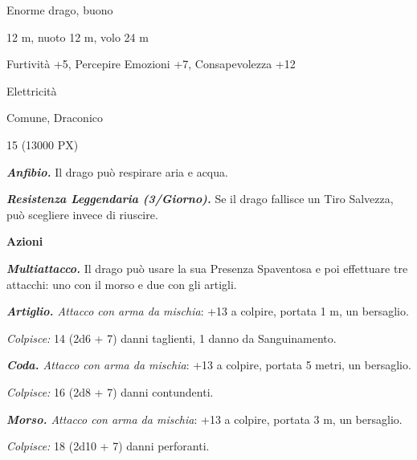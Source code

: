 \begin{multicols}{2}
{
\begin{description}[noitemsep, topsep=0pt, parsep=0pt, partopsep=0pt, itemsep=1pt, leftmargin=2.35cm,  labelwidth=2.2cm, itemindent=0cm, listparindent=0pt] %
\setlength{\baselineskip}{10pt}
\item[\textbf{Taglia/Tipo}] Enorme drago, buono
\item[\textbf{Caratt.}] 
\item[\textbf{Punti Ferita}] 
\item[\textbf{Movimento}] 12 m, nuoto 12 m, volo 24 m
\item[\textbf{Tiri Salvez.}] 
\item[\textbf{Comp.}] Furtività +5, Percepire Emozioni +7, Consapevolezza +12
\item[\textbf{Imm. Danni}] Elettricità
\item[\textbf{Sensi}] 
\item[\textbf{Linguaggi}] Comune, Draconico
\item[\textbf{Sfida}] 15 (13000 PX)
\end{description}
\smallskip

\emph{\textbf{Anfibio.}} Il drago può respirare aria e acqua.

\emph{\textbf{Resistenza Leggendaria (3/Giorno).}} Se il drago fallisce un Tiro Salvezza, può scegliere invece di riuscire.

\textbf{Azioni}

\emph{\textbf{Multiattacco.}} Il drago può usare la sua Presenza Spaventosa e poi effettuare tre attacchi: uno con il morso e due con gli artigli.

\emph{\textbf{Artiglio.} Attacco con arma da mischia}: +13 a colpire, portata 1 m, un bersaglio.

\emph{Colpisce:} 14 (2d6 + 7) danni taglienti, 1 danno da Sanguinamento.

\emph{\textbf{Coda.} Attacco con arma da mischia}: +13 a colpire, portata 5 metri, un bersaglio.

\emph{Colpisce:} 16 (2d8 + 7) danni contundenti.

\emph{\textbf{Morso.} Attacco con arma da mischia}: +13 a colpire, portata 3 m, un bersaglio.

\emph{Colpisce:} 18 (2d10 + 7) danni perforanti.

}
\end{multicols}
